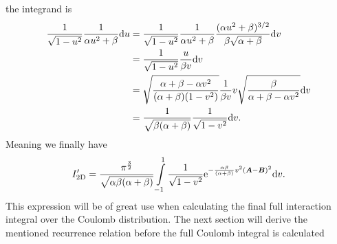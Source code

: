     the integrand is
        \begin{align}
            \frac{1}{\sqrt{1 - u^2}} \frac{1}{\alpha u^2 + \beta} \mathrm{d} u &=
            \frac{1}{\sqrt{1-u^2}} \frac{1}{\alpha u^2 + \beta} \frac{(\alpha
            u^2 + \beta)^{3/2}}{\beta\sqrt{\alpha+\beta}}\mathrm{d} v \nonumber \\
            &= \frac{1}{\sqrt{1-u^2}} \frac{u}{\beta v}\mathrm{d} v \nonumber \\
            &= \sqrt{\frac{\alpha+\beta -\alpha
            v^2}{(\alpha+\beta)(1-v^2)}}\frac{1}{\beta
            v}v\sqrt{\frac{\beta}{\alpha+\beta-\alpha v^2}} \mathrm{d} v \nonumber \\
            &= \frac{1}{\sqrt{\beta(\alpha+\beta)}} \frac{1}{\sqrt{1 - v^2}}
            \mathrm{d} v.
        \end{align}
    Meaning we finally have
        \begin{equation}
            I'_{\text{2D}} =
            \frac{\pi^{\frac{3}{2}}}{\sqrt{\alpha\beta(\alpha+\beta)}}
            \int\limits^{1}_{-1} \frac{1}{\sqrt{1 - v^2}}
            \mathrm{e}^{-\frac{\alpha\beta}{(\alpha + \beta)}v^2(\boldsymbol{{A}}-\boldsymbol{{B}})^2}
            \mathrm{d} v.
            \label{eq:coulombInteractionSimpleFinal}
        \end{equation}
    This expression will be of great use when calculating the final full
    interaction integral over the Coulomb distribution. The next section will
    derive the mentioned recurrence relation before the full Coulomb integral
    is calculated

